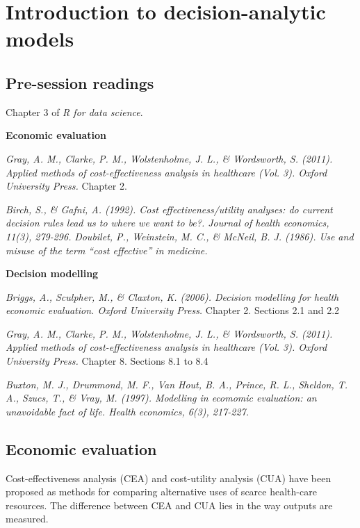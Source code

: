 \documentclass[
]{book}
\begin{document}
\hypertarget{decision}{%
\chapter{Introduction to decision-analytic models}\label{decision}}

\hypertarget{pre-session-readings-1}{%
\section{Pre-session readings}\label{pre-session-readings-1}}

Chapter 3 of \emph{R for data science}.

\textbf{Economic evaluation}

\emph{Gray, A. M., Clarke, P. M., Wolstenholme, J. L., \& Wordsworth, S. (2011). Applied methods of cost-effectiveness analysis in healthcare (Vol. 3). Oxford University Press.} Chapter 2.

\emph{Birch, S., \& Gafni, A. (1992). Cost effectiveness/utility analyses: do current decision rules lead us to where we want to be?. Journal of health economics, 11(3), 279-296.}
\emph{Doubilet, P., Weinstein, M. C., \& McNeil, B. J. (1986). Use and misuse of the term ``cost effective'' in medicine.}

\textbf{Decision modelling}

\emph{Briggs, A., Sculpher, M., \& Claxton, K. (2006). Decision modelling for health economic evaluation. Oxford University Press.} Chapter 2. Sections 2.1 and 2.2

\emph{Gray, A. M., Clarke, P. M., Wolstenholme, J. L., \& Wordsworth, S. (2011). Applied methods of cost-effectiveness analysis in healthcare (Vol. 3). Oxford University Press.} Chapter 8. Sections 8.1 to 8.4

\emph{Buxton, M. J., Drummond, M. F., Van Hout, B. A., Prince, R. L., Sheldon, T. A., Szucs, T., \& Vray, M. (1997). Modelling in ecomomic evaluation: an unavoidable fact of life. Health economics, 6(3), 217-227.}

\hypertarget{economic-evaluation-1}{%
\section{Economic evaluation}\label{economic-evaluation-1}}

Cost-effectiveness analysis (CEA) and cost-utility analysis (CUA) have been proposed as methods for comparing alternative uses of scarce health-care resources. The difference between CEA and CUA lies in the way outputs are measured.
\end{document}
